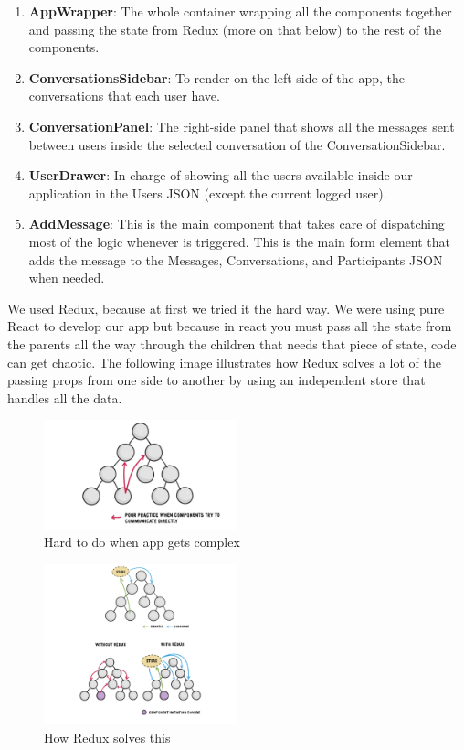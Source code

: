 \begin{enumerate}
	\item \textbf{AppWrapper}: The whole container wrapping all the components together and passing the state from Redux (more on that below) to the rest of the components.
	\item \textbf{ConversationsSidebar}: To render on the left side of the app, the conversations that each user have.
	\item \textbf{ConversationPanel}: The right-side panel that shows all the messages sent between users inside the selected conversation of the ConversationSidebar.
	\item \textbf{UserDrawer}: In charge of showing all the users available inside our application in the Users JSON (except the current logged user).
	\item \textbf{AddMessage}: This is the main component that takes care of dispatching most of the logic whenever is triggered. This is the main form element that adds the message to the Messages, Conversations, and Participants JSON when needed.
					
\end{enumerate}


We used Redux, because at first we tried it the hard way. We were using pure React to develop our app but because in react you must pass all the state from the parents all the way through the children that needs that piece of state, code can get chaotic. The following image illustrates how Redux solves a lot of the passing props from one side to another by using an independent store that handles all the data.

\begin{figure}[ht]
\centering
\includegraphics[width=0.5\textwidth]{figs/poorpractice}
	\caption{Hard to do when app gets complex}
	\label{fig:poorpractice}
\end{figure}


\begin{figure}[ht]
\centering
\includegraphics[width=0.5\textwidth]{figs/rtrtrtryeyeyeye}
	\caption{How Redux solves this}
	\label{fig:rtrtrtryeyeyeye}
\end{figure}

